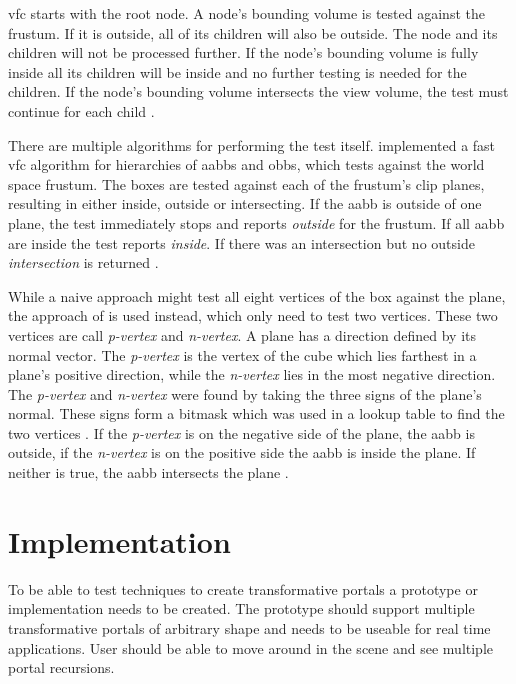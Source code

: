 \Gls{vfc} starts with the root node. A node's bounding volume is tested against the frustum. If it is outside, all of its children will also be outside. The node and its children will not be processed further. If the node's bounding volume is fully inside all its children will be inside and no further testing is needed for the children. If the node's bounding volume intersects the view volume, the test must continue for each child \cite{akine:2018:realtime}.

There are multiple algorithms for performing the test itself. \textcite{assarsson:2000:optimized} implemented a fast \gls{vfc} algorithm for hierarchies of \glspl{aabb} and \glspl{obb}, which tests against the world space frustum. The boxes are tested against each of the frustum's clip planes, resulting in either inside, outside or intersecting. If the \gls{aabb} is outside of one plane, the test immediately stops and reports \textit{outside} for the frustum. If all \gls{aabb} are inside the test reports \textit{inside}. If there was an intersection but no outside \textit{intersection} is returned \cite{assarsson:2000:optimized}.

While a naive approach might test all eight vertices of the box against the plane, the approach of \textcite{greene:1994:detecting} is used instead, which only need to test two vertices. These two vertices are call \textit{p-vertex} and \textit{n-vertex}. A plane has a direction defined by its normal vector. The \textit{p-vertex} is the vertex of the cube which lies farthest in a plane's positive direction, while the \textit{n-vertex} lies in the most negative direction. The \textit{p-vertex} and \textit{n-vertex} were found by taking the three signs of the plane's normal. These signs form a bitmask which was used in a lookup table to find the two vertices \cite{assarsson:2000:optimized}. If the \textit{p-vertex} is on the negative side of the plane, the \gls{aabb} is outside, if the \textit{n-vertex} is on the positive side the \gls{aabb} is inside the plane. If neither is true, the \gls{aabb} intersects the plane \cite{greene:1994:detecting}.

\chapter{Implementation}
\label{section:implementation}
To be able to test techniques to create transformative portals a prototype or implementation needs to be created. The prototype should support multiple transformative portals of arbitrary shape and needs to be useable for real time applications. User should be able to move around in the scene and see multiple portal recursions.

